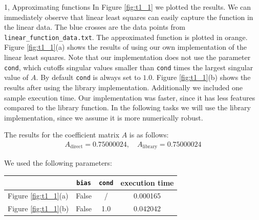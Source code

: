 \begin{task}{1, Approximating functions}
In Figure \ref{fig:t1_1} we plotted the results. We can immediately observe that linear least squares can easily capture the function in the linear data. The blue crosses are the data points from \verb|linear_function_data.txt|. The approximated function is plotted in orange. Figure \ref{fig:t1_1}(a) shows the results of using our own implementation of the linear least squares. Note that our implementation does not use the parameter \verb|cond|, which cutoffs singular values smaller than \verb|cond| times the largest singular value of $A$. By default \verb|cond| is always set to $1.0$. Figure \ref{fig:t1_1}(b) shows the results after using the library implementation. Additionally we included one sample execution time. Our implementation was faster, since it has less features compared to the library function. In the following tasks we will use the library implementation, since we assume it is more numerically robust.\\

\begin{minipage}{\linewidth}%
The results for the coefficient matrix $A$ is as follows:
\begin{align*}
    A_{\text{direct}} = 0.75000024,\quad A_{\text{library}} = 0.75000024
\end{align*}

We used the following parameters:
\begin{center}
    \bgroup
    \def\arraystretch{1.5}
    \begin{tabular}{ |l|c|c|c| }
    \hline
    & \verb|bias|  & \verb|cond| & execution time\\
    \hline
    Figure \ref{fig:t1_1}(a) & False &  /  & 0.000165\\
    \hline
    Figure \ref{fig:t1_1}(b) & False & 1.0 & 0.042042\\
    \hline
    \end{tabular}
    \egroup
\end{center}
\end{minipage}


\end{task}
